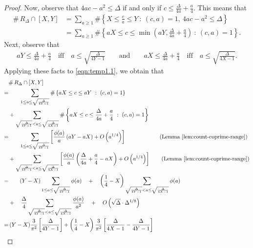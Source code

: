 \documentclass[11pt,letterpaper,reqno]{amsart}
\numberwithin{equation}{section}
\numberwithin{figure}{section}
\numberwithin{table}{section}
\newcommand{\lrp}[1]{\left(#1\right)}
\newcommand{\lrb}[1]{\left[#1\right]}
\newcommand{\lrcb}[1]{\left\{#1\right\}}
\begin{document}
\begin{proof}
    Now, observe that $4ac-a^2 \le \Delta$ if and only if $c \le \frac{\Delta}{4a}+\frac{a}{4}$. This means that
    \begin{align} 
        \#\, R_{\Delta} \cap [X,Y] 
        &= \sum_{a \ge 1} \#\lrcb{ X \le \frac{c}{a} \le Y ~:~ (c,a)=1,\ 4ac-a^2 \le \Delta} \\
        &= \sum_{a \ge 1} \#\lrcb{ aX \le c \le \min\lrp{aY, \frac{\Delta}{4a}+\frac{a}{4}} ~:~ (c,a)=1}.
        \label{eqn:temp1.1}
    \end{align}
    Next, observe that 
    \begin{align}
        aY \le \frac{\Delta}{4a} + \frac{a}{4} \quad\text{iff}\quad a \le \sqrt{\frac{\Delta}{4Y-1}} \qquad
        \text{and}\qquad
        aX \le \frac{\Delta}{4a} + \frac{a}{4} \quad\text{iff}\quad a \le \sqrt{\frac{\Delta}{4X-1}} .
    \end{align}
    Applying these facts to \eqref{eqn:temp1.1}, we obtain that
    \begin{align} 
        &\#\, R_{\Delta} \cap [X,Y]  \\
        =&\qquad 
        \sum_{1 \le a \le \sqrt{\frac{\Delta}{4Y-1}}} \#\lrcb{ aX \le c \le aY  ~:~ (c,  a)=1}  \\
        &+
        \sum_{\sqrt{\frac{\Delta}{4Y-1}} < a \le \sqrt{\frac{\Delta}{4X-1}}} \#\lrcb{ aX \le c \le  \frac{\Delta}{4a}+\frac{a}{4} ~:~ (c,a)=1} \\
        =&\qquad \sum_{1 \le a \le \sqrt{\frac{\Delta}{4Y-1}}} \lrb{\frac{\phi(a)}{a} \lrp{aY-aX} + O\lrp{a^{1/4}}} 
        \qquad\qquad\qquad \text{(Lemma \ref{lem:count-coprime-range})}\\
        &+
        \sum_{\sqrt{\frac{\Delta}{4Y-1}} < a \le \sqrt{\frac{\Delta}{4X-1}}}  \lrb{\frac{\phi(a)}{a} \lrp{\frac{\Delta}{4a}+\frac{a}{4} - aX} + O\lrp{a^{1/4}} }
        \qquad\text{(Lemma \ref{lem:count-coprime-range})}\\
        =&\qquad (Y-X) \sum_{1 \le a \le \sqrt{\frac{\Delta}{4Y-1}}} \phi(a) 
        \quad+\quad \lrp{\frac14-X} \sum_{\sqrt{\frac{\Delta}{4Y-1}} < a \le \sqrt{\frac{\Delta}{4X-1}}} \phi(a)
        \\
        &+\quad
        \frac{\Delta}{4} \sum_{\sqrt{\frac{\Delta}{4Y-1}} < a \le \sqrt{\frac{\Delta}{4X-1}}}  \frac{\phi(a)}{a^2}  \quad+\quad O\lrp{\sqrt{\Delta} \cdot \Delta^{1/8}} \\
        =&\, (Y-X) \frac{3}{\pi^2} \lrb{\frac{\Delta}{4Y-1}} 
        + \lrp{\frac14-X} \frac{3}{\pi^2}\lrb{\frac{\Delta}{4X-1} - \frac{\Delta}{4Y-1}}

\end{align}
\end{proof}
\end{document}
